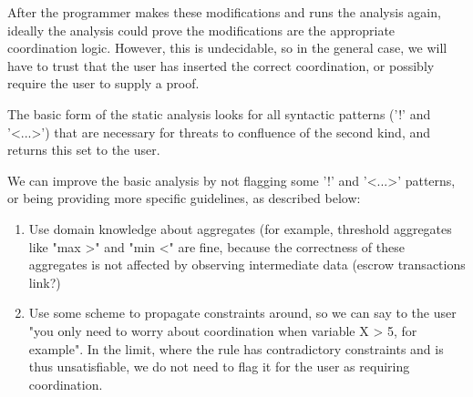 After the programmer makes these modifications and runs the analysis again, ideally
the analysis could prove the modifications are the appropriate coordination logic.
However, this is undecidable, so in the general case, we will have to trust that the
user has inserted the correct coordination, or possibly require the user to supply a
proof.

The basic form of the static analysis looks for all syntactic patterns ('!' and
'<...>') that are necessary for threats to confluence of the second kind, and
returns this set to the user.

We can improve the basic analysis by not flagging some '!' and '<...>' patterns, or being providing more specific guidelines, as described below:

\begin{enumerate}
%
\item Use domain knowledge about aggregates (for example, threshold aggregates
like "max >" and "min <" are fine, because the correctness of these aggregates
is not affected by observing intermediate data (escrow transactions link?)
%
\item Use some scheme to propagate constraints around, so we can say to the
user "you only need to worry about coordination when variable X > 5, for
example".  In the limit, where the rule has contradictory constraints and is
thus unsatisfiable, we do not need to flag it for the user as requiring
coordination.
%
\end{enumerate}
